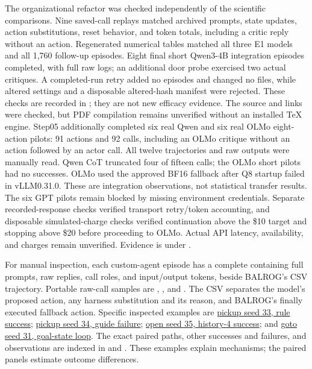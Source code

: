 \documentclass[11pt,a4paper]{article}
\begin{document}
The organizational refactor was checked independently of the scientific comparisons. Nine saved-call replays matched archived prompts, state updates, action substitutions, reset behavior, and token totals, including a critic reply without an action. Regenerated numerical tables matched all three E1 models and all 1,760 follow-up episodes. Eight final short Qwen3-4B integration episodes completed, with full raw logs; an additional door probe exercised two actual critiques. A completed-run retry added no episodes and changed no files, while altered settings and a disposable altered-hash manifest were rejected. These checks are recorded in ; they are not new efficacy evidence. The source and links were checked, but PDF compilation remains unverified without an installed TeX engine. Step05 additionally completed six real Qwen and six real OLMo eight-action pilots: 91 actions and 92 calls, including an OLMo critique without an action followed by an actor call. All twelve trajectories and raw outputs were manually read. Qwen CoT truncated four of fifteen calls; the OLMo short pilots had no successes. OLMo used the approved BF16 fallback after Q8 startup failed in vLLM0.31.0. These are integration observations, not statistical transfer results. The six GPT pilots remain blocked by missing environment credentials. Separate recorded-response checks verified transport retry/token accounting, and disposable simulated-charge checks verified continuation above the \$10 target and stopping above \$20 before proceeding to OLMo. Actual API latency, availability, and charges remain unverified. Evidence is under .

For manual inspection, each custom-agent episode has a complete  containing full prompts, raw replies, call roles, and input/output tokens, beside BALROG's CSV trajectory. Portable raw-call samples are , , and . The CSV separates the model's proposed action, any harness substitution and its reason, and BALROG's finally executed fallback action. Specific inspected examples are \href{run:../experiment_results/followup_v1/episodes/babyai/pickup/guide_gate/seed_033/rep_0/llm_calls.jsonl}{pickup seed 33, rule success}; \href{run:../experiment_results/followup_v1/episodes/babyai/pickup/guide/seed_034/rep_0/llm_calls.jsonl}{pickup seed 34, guide failure}; \href{run:../experiment_results/followup_v1/episodes/babyai/open/guide_h4/seed_035/rep_0/llm_calls.jsonl}{open seed 35, history-4 success}; and \href{run:../experiment_results/followup_v1/episodes/babyai/goto/guide_goal/seed_031/rep_0/llm_calls.jsonl}{goto seed 31, goal-state loop}. The exact paired paths, other successes and failures, and observations are indexed in  and . These examples explain mechanisms; the paired panels estimate outcome differences.
\end{document}
